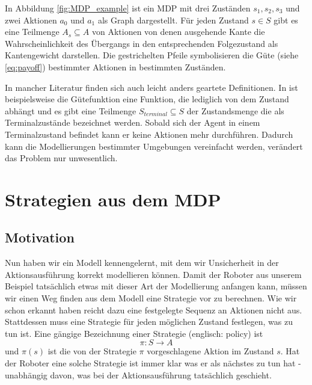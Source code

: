 \documentclass[a4paper]{IEEEtran}
\begin{document}
In Abbildung \ref{fig:MDP_example} ist ein MDP mit drei Zuständen $s_1, s_2, s_3$ und zwei Aktionen $a_0$ und $a_1$ als Graph dargestellt. Für jeden Zustand $s \in S$ gibt es eine Teilmenge $A_s \subseteq A$ von Aktionen von denen ausgehende Kante die Wahrscheinlichkeit des Übergangs in den entsprechenden Folgezustand als Kantengewicht darstellen. Die gestrichelten Pfeile symbolisieren die Güte (siehe \ref{eq:payoff}) bestimmter Aktionen in bestimmten Zuständen.

In mancher Literatur finden sich auch leicht anders geartete Definitionen. In \cite{russell1995artificial} ist beispielsweise die Gütefunktion eine Funktion, die lediglich von dem Zustand abhängt und es gibt eine Teilmenge $S_{terminal} \subseteq S$ der Zustandsmenge die als Terminalzustände bezeichnet werden. Sobald sich der Agent in einem Terminalzustand befindet kann er keine Aktionen mehr durchführen. Dadurch kann die Modellierungen bestimmter Umgebungen vereinfacht werden, verändert das Problem nur unwesentlich.


\section{Strategien aus dem MDP}
\subsection{Motivation}
Nun haben wir ein Modell kennengelernt, mit dem wir Unsicherheit in der Aktionsausführung korrekt modellieren können. Damit der Roboter aus unserem Beispiel tatsächlich etwas mit dieser Art der Modellierung anfangen kann, müssen wir einen Weg finden aus dem Modell eine Strategie vor zu berechnen. Wie wir schon erkannt haben reicht dazu eine festgelegte Sequenz an Aktionen nicht aus. Stattdessen muss eine Strategie für jeden möglichen Zustand festlegen, was zu tun ist. Eine gängige Bezeichnung einer Strategie (englisch: policy) ist
\begin{equation}
	\pi:S \rightarrow A
	\label{eq:policy}
\end{equation}
und $\pi(s)$ ist die von der Strategie $\pi$ vorgeschlagene Aktion im Zustand $s$. Hat der Roboter eine solche Strategie ist immer klar was er als nächstes zu tun hat - unabhängig davon, was bei der Aktionsausführung tatsächlich geschieht.
\end{document}
